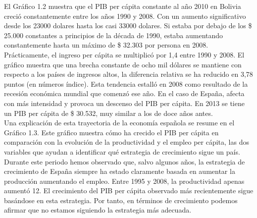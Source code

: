     El Gráfico 1.2 muestra que el PIB per cápita constante al año 2010 en Bolivia creció constantemente entre los años 1990 y 2008. Con un aumento significativo desde los 23000 dolares hasta los casi 33000 dolares.  Si estaba por debajo de los \$ 25.000 constantes a principios de la década de 1990, estaba aumentando constantemente hasta un máximo de \$ 32.303 por persona en 2008. Prácticamente, el ingreso per cápita se multiplicó por 1,4 entre 1990 y 2008. El gráfico muestra que una brecha constante de ocho mil dólares se mantiene con respecto a los países de ingresos altos, la diferencia relativa se ha reducido en 3,78 puntos (en números índice). Esta tendencia estalló en 2008 como resultado de la recesión económica mundial que comenzó ese año. En el caso de España, afecta con más intensidad y provoca un descenso del PIB per cápita. En 2013 se tiene un PIB per cápita de \$ 30.532, muy similar a los de doce años antes.\\
    Una explicación de esta trayectoria de la economía española se resume en el Gráfico 1.3. Este gráfico muestra cómo ha crecido el PIB per cápita en comparación con la evolución de la productividad y el empleo per cápita, las dos variables que ayudan a identificar qué estrategia de crecimiento sigue un país. Durante este periodo hemos observado que, salvo algunos años, la estrategia de crecimiento de España siempre ha estado claramente basada en aumentar la producción aumentando el empleo. Entre 1995 y 2008, la productividad apenas aumentó 12. El crecimiento del PIB per cápita observado más recientemente sigue basándose en esta estrategia. Por tanto, en términos de crecimiento podemos afirmar que no estamos siguiendo la estrategia más adecuada.\\

